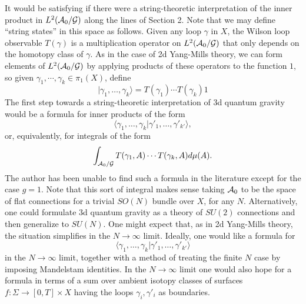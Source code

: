 \documentclass[12pt]{article}
\newcommand{\maps}{\colon}
\newcommand{\A}{{\cal A}}
\newcommand{\G}{{\cal G}}
\begin{document}
It would be satisfying if there were a string-theoretic interpretation of
the inner product in $L^2(\A_0/\G)$ along the lines of Section 2.     Note
that we may define ``string states'' in this space as follows.
Given any loop $\gamma$ in $X$, the Wilson loop observable $T(\gamma)$ is a
multiplication operator on $L^2(\A_0/\G)$ that only depends on the homotopy
class of $\gamma$.   As in the case of 2d Yang-Mills theory, we can form
elements of $L^2(\A_0/\G)$ by applying products of these operators to the
function $1$, so given $\gamma_1, \cdots, \gamma_k \in \pi_1(X)$, define
\[     | \gamma_1, \dots, \gamma_k \rangle =  T(\gamma_1) \cdots
T(\gamma_k) 1 \]
The first step towards a string-theoretic interpretation of 3d quantum
gravity would be a formula for inner products of the form
\[    \langle\gamma_1, \dots, \gamma_k| \gamma'_1, \dots,
\gamma'_{k'}\rangle, \]
or, equivalently, for integrals of the form
\[     \int_{\A_0/\G} T(\gamma_1,A) \cdots T(\gamma_k,A) d\mu(A) .\]
The author has been unable to find such a formula in the literature except
for the case $g = 1$.
Note that this sort of integral makes sense taking $\A_0$ to be the space of
flat connections for a trivial $SO(N)$ bundle over $X$, for any $N$.
Alternatively, one could formulate 3d quantum gravity as a theory of $SU(2)$
connections and then generalize to $SU(N)$.
One might expect that, as in 2d Yang-Mills theory, the situation
simplifies in the $N \to \infty$ limit.  Ideally, one would like a formula
for
\[    \langle\gamma_1, \dots, \gamma_k| \gamma'_1, \dots,
\gamma'_{k'}\rangle \]
in the $N \to\infty$ limit, together with a method of treating the
finite $N$ case by imposing Mandelstam identities.   In the $N \to \infty$
limit one would also hope for a formula in
terms of a sum over ambient isotopy classes
of surfaces $f \maps \Sigma \to [0,T] \times X$ having
the loops $\gamma_i, \gamma'_i$ as boundaries.
\end{document}
